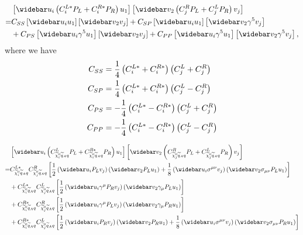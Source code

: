 \documentclass[english,notitlepage]{article}
\begin{document}
    \begin{align}
        \nonumber
          & \bclosed{\wbar{u}_i \pclosed{C^{L*}_i P_L + C^{R*}_i P_R} u_1} \bclosed{\wbar{v}_2 \pclosed{C^{R}_j P_L + C^{L}_j P_R} v_j}                     \\
        \nonumber
        = & C_{SS}\bclosed{\wbar{u}_i u_1} \bclosed{\wbar{v}_2 v_j} + C_{SP}\bclosed{\wbar{u}_i u_1} \bclosed{\wbar{v}_2 \gamma^5 v_j}                      \\
          & + C_{PS}\bclosed{\wbar{u}_i \gamma^5 u_1} \bclosed{\wbar{v}_2 v_j} + C_{PP}\bclosed{\wbar{u}_i \gamma^5 u_1} \bclosed{\wbar{v}_2 \gamma^5 v_j},
    \end{align}
    where we have
    \begin{subequations}
        \begin{align}
            C_{SS} & = \frac{1}{4} \left(C^{L*}_i + C^{R*}_i\right)\left(C^{L}_j + C^{R}_j\right)  \\
            C_{SP} & = \frac{1}{4} \left(C^{L*}_i + C^{R*}_i\right)\left(C^{L}_j - C^{R}_j\right)  \\
            C_{PS} & = -\frac{1}{4} \left(C^{L*}_i - C^{R*}_i\right)\left(C^{L}_j + C^{R}_j\right) \\
            C_{PP} & = -\frac{1}{4} \left(C^{L*}_i - C^{R*}_i\right)\left(C^{L}_j - C^{R}_j\right)
        \end{align}
    \end{subequations}

    \begin{align}
        \nonumber
          & \bclosed{\wbar{u}_i \pclosed{C^{L}_{\nino[i]\wtilde{q}_A q} P_L + C^{R*}_{\nino[i]\wtilde{q}_A q} P_R} u_1}
        \bclosed{\wbar{v}_2 \pclosed{C^{R}_{\nino[j]\wtilde{q}_A q} P_L + C^{L}_{\nino[j]\wtilde{q}_A q} P_R} v_j}                                                                                                                                             \\
        \nonumber
        = & C^{L*}_{\nino[i]\wtilde{q}_A q}C^{R}_{\nino[j]\wtilde{q}_A q} \bclosed{\frac{1}{2}\pclosed{\wbar{u}_i P_L v_j} \pclosed{\wbar{v}_2 P_L u_1} + \frac{1}{8}\pclosed{\wbar{u}_i \sigma^{\mu\nu} v_j} \pclosed{\wbar{v}_2 \sigma_{\mu\nu} P_L u_1} }   \\
        \nonumber
          & + C^{L*}_{\nino[i]\wtilde{q}_A q}C^{L}_{\nino[j]\wtilde{q}_A q} \bclosed{\frac{1}{2}\pclosed{\wbar{u}_i \gamma^\mu P_R v_j} \pclosed{\wbar{v}_2 \gamma_\mu P_L u_1}}                                                                               \\
        \nonumber
          & + C^{R*}_{\nino[i]\wtilde{q}_A q}C^{R}_{\nino[j]\wtilde{q}_A q} \bclosed{\frac{1}{2}\pclosed{\wbar{u}_i \gamma^\mu P_L v_j} \pclosed{\wbar{v}_2 \gamma_\mu P_R u_1}}                                                                               \\
          & + C^{R*}_{\nino[i]\wtilde{q}_A q}C^{L}_{\nino[j]\wtilde{q}_A q} \bclosed{\frac{1}{2}\pclosed{\wbar{u}_i P_R v_j} \pclosed{\wbar{v}_2 P_R u_1} + \frac{1}{8}\pclosed{\wbar{u}_i \sigma^{\mu\nu} v_j} \pclosed{\wbar{v}_2 \sigma_{\mu\nu} P_R u_1} }
    \end{align}
\end{document}
